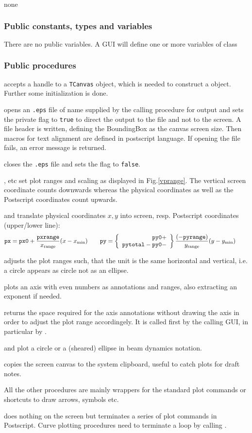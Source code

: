 \documentclass[12pt]{article}
\newcommand\code[1]{{\tt #1}}
\newcommand{\unico}[1]{{\color{burntorange}\code{#1}}}
\newcommand{\opaguif}[1]{\colorbox{violet!30}{{\color{black}\code{#1}}}}
\newcommand{\oguif}[1]{\hyperref[#1]{\opaguif{#1}}}
\newcommand{\uses}[1]{\flushleft {\bf Uses:} #1}
\newcommand{\pvar}[1]{\subsubsection*{Public constants, types and variables} #1}
\newcommand{\ppro}[1]{\subsubsection*{Public procedures} #1}
\begin{document}
\uses{none}

\pvar{
There are no public variables. A GUI will define one or more variables of class \unico{Vplot}
}

\ppro{
\unico{Create} accepts a handle to a \code{TCanvas} object, which is needed to construct a \unico{Vplot} object. Further some initialization is done.

\unico{PS\_start} opens an \code{*.eps} file of name \unico{psfile} supplied by the calling procedure for output and sets the private flag \unico{PS} to \code{true} to direct the output to the file and not to the screen. A file header is written, defining the BoundingBox as the canvas screen size. Then macros for text alignment are defined in postscript language. If opening the file fails, an error message is returned.

\unico{PS\_stop} closes the \code{*.eps} file and sets the flag \unico{PS} to \code{false}.

\unico{SetRange*}, \unico{SetMargin*} etc set plot ranges and scaling as displayed in Fig.\ref{vprange}. The vertical screen coordinate counts downwards whereas the physical coordinates as well as the Postscript coordinates count upwards. 

\unico{getpx,getpy} and \unico{PS\_getpxr,PS\_getpyr} translate physical coordinates $x,y$ into screen, resp. Postscript coordinates (upper/lower line):
\[
{\tt px}={\tt px0}+\frac{\tt pxrange}{x_{\rm range}} (x-x_{\rm min}) \qquad
{\tt py}=\left\{ \begin{array}{r} {\tt py0} + \\ {\tt pytotal} - {\tt py0} -  \end{array} \right\} \frac{(-{\tt pyrange})}{y_{\rm range}} (y-y_{\rm min}) \qquad
\]

\unico{AdjustAspectRatio} adjusts the plot ranges such, that the unit is the same horizontal and vertical, i.e. a circle appears as circle not as an ellipse.

\unico{Axis} plots an axis with even numbers as annotations and ranges, also extracting an exponent if needed. 

\unico{GetAxisSpace} returns the space required for the axis annotations without drawing the axis in order to adjust the plot range accordingely. It is called first by the calling GUI, in particular by \oguif{comfigureframe}.

\unico{Circle} and \unico{Ellipse} plot a circle or a (sheared) ellipse in beam dynamics notation.

\unico{GrabImage} copies the screen canvas to the system clipboard, useful to catch plots for draft notes.

All the other procedures are mainly wrappers for the standard plot commands or shortcuts to draw arrows, symbols etc.

\unico{Stroke} does nothing on the screen but terminates a series of plot commands in Postscript. Curve plotting procedures need to terminate a \unico{LineTo...} loop by calling \unico{stroke}.
}
\end{document}
